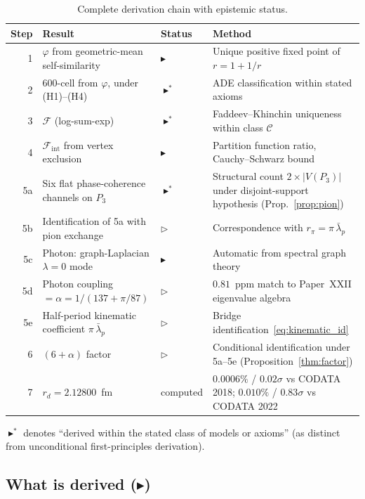 \documentclass[12pt]{article}
\newcommand{\Fcal}{\mathcal{F}}
\newcommand{\Fint}{\Fcal_{\mathrm{int}}}
\newcommand{\phig}{\varphi}
\newcommand{\lbar}{\bar{\lambda}}
\begin{document}
\begin{table}[ht]
\centering
\caption{Complete derivation chain with epistemic status.}
\label{tab:chain}
\begin{tabular}{@{}rlll@{}}
\toprule
Step & Result & Status & Method \\
\midrule
1 & $\phig$ from geometric-mean self-similarity & $\blacktriangleright$ & Unique positive fixed point of $r = 1 + 1/r$ \\
2 & 600-cell from $\phig$, under (H1)--(H4) & $\blacktriangleright^\ast$ & ADE classification within stated axioms \\
3 & $\Fcal$ (log-sum-exp) & $\blacktriangleright^\ast$ & Faddeev--Khinchin uniqueness within class $\mathcal{C}$ \\
4 & $\Fint$ from vertex exclusion & $\blacktriangleright$ & Partition function ratio, Cauchy--Schwarz bound \\
5a & Six flat phase-coherence channels on $P_3$ & $\blacktriangleright^\ast$ & Structural count $2 \times |V(P_3)|$ under disjoint-support hypothesis (Prop.~\ref{prop:pion}) \\
5b & Identification of 5a with pion exchange & $\triangleright$ & Correspondence with $r_\pi = \pi\,\lbar_p$~\citep{SmartRadius} \\
5c & Photon: graph-Laplacian $\lambda{=}0$ mode & $\blacktriangleright$ & Automatic from spectral graph theory \\
5d & Photon coupling $= \alpha = 1/(137 + \pi/87)$ & $\triangleright$ & $0.81$~ppm match to Paper~XXII eigenvalue algebra \\
5e & Half-period kinematic coefficient $\pi\,\lbar_p$ & $\triangleright$ & Bridge identification~\eqref{eq:kinematic_id} \\
6 & $(6{+}\alpha)$ factor & $\triangleright$ & Conditional identification under 5a--5e (Proposition~\ref{thm:factor}) \\
7 & $r_d = 2.12800$~fm & computed & $0.0006\%$ / $0.02\sigma$ vs CODATA 2018; $0.010\%$ / $0.83\sigma$ vs CODATA 2022 \\
\bottomrule
\end{tabular}
\end{table}

\noindent\footnotesize{$\blacktriangleright^\ast$ denotes ``derived
within the stated class of models or axioms'' (as distinct from
unconditional first-principles derivation).}

\subsection{What is derived ($\blacktriangleright$)}
\end{document}
